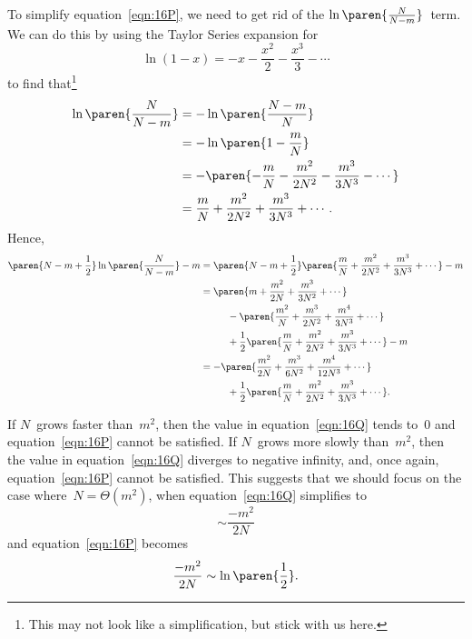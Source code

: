 To simplify equation~\eqref{eqn:16P}, we need to get rid of the
$\ln\paren{\frac{N}{N - m}}$~term.  We can do this by using the Taylor
Series expansion for
\begin{equation*}
    \ln(1 - x) = -x - \frac{x^2}{2} - \frac{x^3}{3} - \cdots
\end{equation*}
to find that\footnote{This may not look like a simplification, but
  stick with us here.}
\begin{align*}
\ln\paren{\frac{N}{N - m}}
    &= - \ln \paren{\frac{N - m}{N}} \\
    &= - \ln \paren{1 - \frac{m}{N}} \\
    &= - \paren{ -\frac{m}{N} - \frac{m^2}{2N^2} - \frac{m^3}{3N^3} - \cdots }\\
    &= \frac{m}{N} + \frac{m^2}{2N^2} + \frac{m^3}{3N^3} + \cdots.
\end{align*}
Hence,
\begin{align}
\paren{N - m + \frac{1}{2}} \ln\paren{\frac{N}{N - m}} - m
    &= \paren{N - m + \frac{1}{2}}
        \paren{\frac{m}{N} + \frac{m^2}{2N^2} + \frac{m^3}{3N^3} + \cdots}
        - m \notag\\
    &= \paren{ m + \frac{m^2}{2N} + \frac{m^3}{3N^2} + \cdots }
            \notag\\
    &\phantom{=}\qquad - \paren{ \frac{m^2}{N} + \frac{m^3}{2N^2} +
          \frac{m^4}{3N^3} + \cdots }
            \notag\\
    &\phantom{=}\qquad + \frac{1}{2} \paren{\frac{m}{N} +
          \frac{m^2}{2N^2} + \frac{m^3}{3N^3} + \cdots} -m 
            \notag\\
    &= - \paren{ \frac{m^2}{2N} + \frac{m^3}{6N^2} + \frac{m^4}{12N^3}
            + \cdots} \notag\\
    &\phantom{=}\qquad
        + \frac{1}{2}\paren{ \frac{m}{N} + \frac{m^2}{2N^2} +
          \frac{m^3}{3N^3} + \cdots }.
    \label{eqn:16Q}
\end{align}

If $N$~grows faster than~$m^2$, then the value in
equation~\eqref{eqn:16Q} tends to~0 and equation~\eqref{eqn:16P}
cannot be satisfied.  If $N$~grows more slowly than~$m^2$, then the
value in equation~\eqref{eqn:16Q} diverges to negative infinity, and,
once again, equation~\eqref{eqn:16P} cannot be satisfied.  This suggests
that we should focus on the case where~$N = \Theta(m^2)$, when
equation~\eqref{eqn:16Q} simplifies to
\begin{equation*}
    \sim \frac{-m^2}{2N}
\end{equation*}
and equation~\eqref{eqn:16P} becomes
\begin{equation}\label{eqn:16R}
    \frac{-m^2}{2N} \sim \ln\paren{\frac{1}{2}}.
\end{equation}

